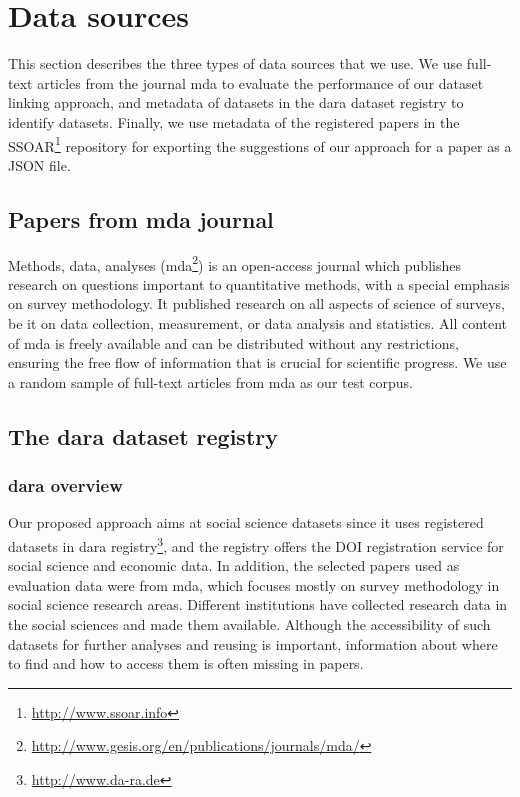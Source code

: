 \documentclass{IOS-Book-Article}
\newcommand{\dara}{\textsf{da\textbar ra}}
\begin{document}
\section{Data sources}
\label{sec:data}
This section describes the three types of data sources that we use. We use full-text articles from the journal mda to evaluate the performance of our dataset linking approach, and metadata of datasets in the {\dara} dataset registry to identify datasets. 
Finally, we use metadata of the registered papers in the SSOAR\footnote{\url{http://www.ssoar.info}} repository for exporting the suggestions of our approach for a paper as a JSON file.
 
 \subsection{Papers from mda journal}
 
 Methods, data, analyses (mda\footnote{\url{http://www.gesis.org/en/publications/journals/mda/}}) is an open-access journal which publishes research on questions important to quantitative methods, with a special emphasis on survey methodology. It published research on all aspects of science of surveys, be it on data collection, measurement, or data analysis and statistics. All content of mda is freely available and can be distributed without any restrictions, ensuring the free flow of information that is crucial for scientific progress. We use a random sample of full-text articles from mda as our test corpus.
  \subsection{The {\dara} dataset registry}
  
  \subsubsection{{\dara} overview}
Our proposed approach aims at social science datasets since it uses registered datasets in {\dara} registry\footnote{\url{http://www.da-ra.de}}, and the registry offers the DOI registration service for social science and economic data. 
In addition, the selected papers used as evaluation data were from mda, which focuses mostly on survey methodology in social science research areas. 
Different institutions have collected research data in the social sciences and made them available. Although the accessibility of such datasets for further analyses and reusing is important, information about where to find and how to access them is often missing in papers.
\end{document}
